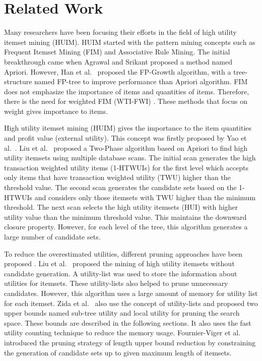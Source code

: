 \documentclass[11pt,openright]{report}
\begin{document}
\section{Related Work}\label{section:relatedwork}
Many researchers have been focusing their efforts in the field of high utility itemset mining (HUIM). HUIM started with the pattern mining concepts \cite{Chen1996, Barber2003, Li2005, Han2000} such as Frequent Itemset Mining (FIM) and Associative Rule Mining. The initial breakthrough came when Agrawal and Srikant \cite{Agrawal1994} proposed a method named Apriori. However, Han et al.~\cite{Han2000} proposed the FP-Growth algorithm, with a tree-structure named FP-tree to improve performance than Apriori algorithm. FIM does not emphasize the importance of items and quantities of items. Therefore, there is the need for weighted FIM (WTI-FWI) \cite{Yun2013, Yun2014}. These methods that focus on weight gives importance to items.

High utility itemset mining (HUIM) \cite{Ahmed2009, Yao2006, Erwin2007, Yen2007, Lin2011, Wu2012, Yao2004, Tseng2013} gives the importance to the item quantities and profit value (external utility). This concept was firstly proposed by Yao et al.~\cite{Yao2004}. Liu et al.~\cite{Liu2005} proposed a Two-Phase algorithm based on Apriori to find high utility itemsets using multiple database scans. The initial scan generates the high transaction weighted utility items (1-HTWUIs) for the first level which accepts only items that have transaction weighted utility (TWU) higher than the threshold value. The second scan generates the candidate sets based on the 1-HTWUIs and considers only those itemsets with TWU higher than the minimum threshold. The next scan selects the high utility itemsets (HUI) with higher utility value than the minimum threshold value. This maintains the downward closure property. However, for each level of the tree, this algorithm generates a large number of candidate sets. 

To reduce the overestimated utilities, different pruning approaches have been proposed \cite{Chu2009, Liu2012, Lan2014, Krishnamoorthy2015, Zida2015, Tseng2013, Fournier-Viger2014, Song2014, Fournier-Viger2016}. Liu et al.~\cite{Liu2012} proposed the mining of high utility itemsets without candidate generation. A utility-list was used to store the information about utilities for itemsets. These utility-lists also helped to prune unnecessary candidates. However, this algorithm uses a large amount of memory for utility list for each itemset. Zida et al.~\cite{Zida2015} also use the concept of utility-lists and proposed two upper bounds named sub-tree utility and local utility for pruning the search space. These bounds are described in the following sections. It also uses the fast utility counting technique to reduce the memory usage. Fournier-Viger et al.~\cite{Fournier-Viger2016} introduced the pruning strategy of length upper bound reduction by constraining the generation of candidate sets up to given maximum length of itemsets. 
\end{document}
